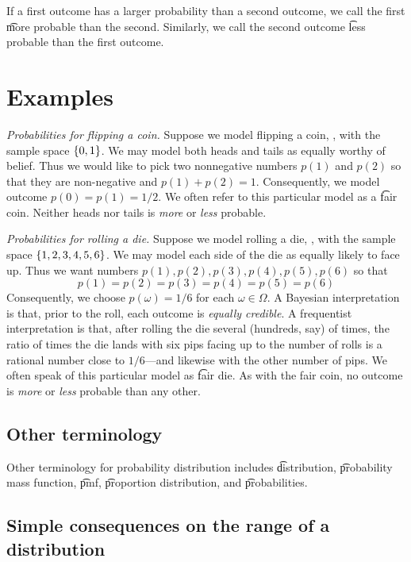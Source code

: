 If a first outcome has a larger probability than a second outcome, we call the first \t{more probable} than the second.
Similarly, we call the second outcome \t{less probable} than the first outcome.

\section*{Examples}

\textit{Probabilities for flipping a coin.}
Suppose we model flipping a coin, , with the sample space $\{0,1\}$.
We may model both heads and tails as equally worthy of belief.
Thus we would like to pick two nonnegative numbers $p(1)$ and $p(2)$ so that they are non-negative and $p(1) + p(2) = 1$.
Consequently, we model outcome $p(0) = p(1) = 1/2 $.
We often refer to this particular model as a \t{fair coin}.
Neither heads nor tails is \textit{more} or \textit{less} probable.

\textit{Probabilities for rolling a die.}
Suppose we model rolling a die, , with the sample space $\{1, 2, 3, 4, 5, 6\}$.
We may model each side of the die as equally likely to face up.
Thus we want numbers $p(1), p(2), p(3), p(4), p(5), p(6)$ so that
\[
p(1) = p(2) = p(3) = p(4) = p(5) = p(6)
\]
Consequently, we choose $p(\omega ) = 1/6$ for each $\omega  \in \Omega $.
A Bayesian interpretation is that, prior to the roll, each outcome is \textit{equally credible}.
A frequentist interpretation is that, after rolling the die several (hundreds, say) of times, the ratio of times the die lands with six pips facing up to the number of rolls is a rational number close to $1/6$---and likewise with the other number of pips.
We often speak of this particular model as \t{fair die}.
As with the fair coin, no outcome is \textit{more} or \textit{less} probable than any other.

\subsection*{Other terminology}

Other terminology for probability distribution includes \t{distribution}, \t{probability mass function}, \t{pmf}, \t{proportion distribution}, and \t{probabilities}.
\subsection*{Simple consequences on the range of a distribution}

